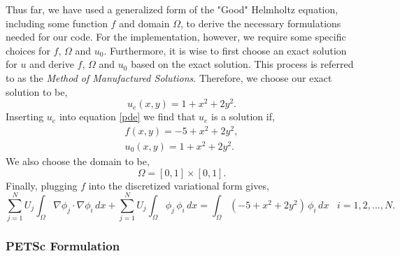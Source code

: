 \documentclass[]{article}
\begin{document}
Thus far, we have used a generalized form of the "Good" Helmholtz equation, including some function $f$ and domain $\Omega$, to derive the necessary formulations needed for our code.  For the implementation, however, we require some specific choices for $f$, $\Omega$ and $u_0$.  Furthermore, it is wise to first choose an exact solution for $u$ and   derive $f$, $\Omega$ and $u_0$ based on the exact solution.  This process is referred to as the \textit{Method of Manufactured Solutions}.  Therefore, we choose our exact solution to be,
\begin{equation}
u_e(x,y) = 1 + x^2 + 2 y^2.
\end{equation}
Inserting $u_e$ into equation \eqref{pde} we find that $u_e$ is a solution if,
\begin{align}
f(x,y) = -5 + x^2 + 2 y^2, \\
u_0(x,y) = 1 + x^2 + 2 y^2.
\end{align}
We also choose the domain to be,
\begin{equation}
\Omega = [0,1] \times [0,1].
\end{equation}
Finally, plugging $f$ into the discretized variational form gives,
\begin{equation}
\sum^N_{j=1} U_j \int_{\Omega} \nabla \phi_j \cdot \nabla \phi_i \, dx + \sum^N_{j=1} U_j \int_{\Omega} \phi_j \, \phi_i \, dx = \int_{\Omega} (-5 + x^2 + 2 y^2) \, \phi_i \, dx \;\;\; i = 1,2,...,N.
\end{equation}



\subsubsection{PETSc Formulation}
\end{document}
